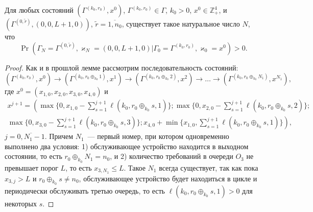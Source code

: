 \documentclass[a4paper,12pt,russian]{extarticle}
\begin{document}
\begin{lemma}
Для любых состояний $(\Gamma^{(k_0,r_0)},x^0)$, $\Gamma^{(k_0,r_0)}\in\Gamma$, $k_0 > 0$, $x^0 \in \mathbb{Z}_+^4$, и $(\Gamma^{(0,\tilde{r})},(0,0,L+1,0))$, $\tilde{r} = \overline{1,n_0}$, существует такое натуральное число $N$, что 
\begin{equation*}
\Pr(\Gamma_{N}=\Gamma^{(0,\tilde{r} )}, \varkappa_{N}=(0,0,L+1,0)|
\Gamma_{0}=\Gamma^{(k_0,r_0)}, \varkappa_{0}=x^0)>0.
\end{equation*}
\label{class:2}
\end{lemma}
\begin{proof}
Как и в прошлой лемме рассмотрим последовательность состояний: 
\begin{equation*}
(\Gamma^{(k_0,r_0)},x^0) \rightarrow (\Gamma^{(k_0,r_0\oplus_{k_0}1)},x^1) \rightarrow (\Gamma^{(k_0,r_0\oplus_{k_0}2)},x^2) \rightarrow \ldots \rightarrow (\Gamma^{(k_0,r_0\oplus_{k_0}N_1)},x^{N_1}),
\end{equation*}
где $x^0=(x_{1,0}, x_{2,0}, x_{3,0}, x_{4,0})$ и
\begin{multline*}
x^{j+1}=\left(\max{\{0,x_{1,0} - \sum_{s=1}^{j+1}\ell(k_0,r_0\oplus_{k_0}s,1)\}};
\max{\{0,x_{2,0} - \sum_{s=1}^{j+1}\ell(k_0,r_0\oplus_{k_0}s,2)\}};\right.\\
\left.\max{\{0,x_{3,0} - \sum_{s=1}^{j+1}\ell(k_0,r_0\oplus_{k_0}s,3)\}};
x_{4,0} + \min{\{x_{1,0}, \sum_{s=1}^{j+1}\ell(k_0,r_0\oplus_{k_0}s,1)\}}\right),
\end{multline*}
$j=\overline{0,N_1-1}$. Причем $N_1$~--- первый номер, при котором одновременно выполнено два условия: 1) обслуживающее устройство находится в выходном состоянии, то есть $r_0\oplus_{k_0}N_1 = n_0$, и 2) количество требований в очереди $O_3$ не превышает порог $L$, то есть  $x_{3,N_1}\leqslant L$. Такое $N_1$ всегда существует, так как пока $x_{3,j}>L$ и $r_0\oplus_{k_0}s \neq n_0$, обслуживающее устройство будет находиться в цикле и периодически обслуживать третью очередь, то есть $\ell(k_0,r_0\oplus_{k_0}s,1)>0$  для некоторых $s$.


\end{proof}
\end{document}
